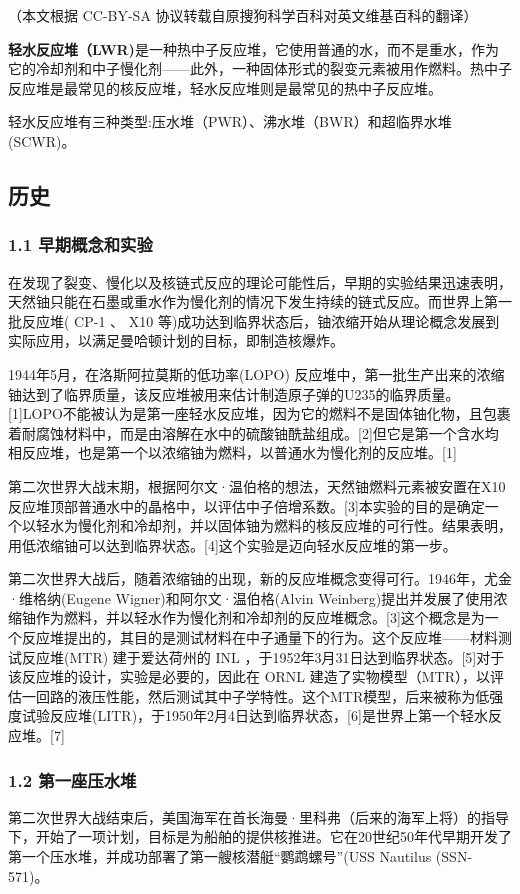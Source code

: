 
（本文根据 CC-BY-SA 协议转载自原搜狗科学百科对英文维基百科的翻译）

\textbf{轻水反应堆（LWR)}是一种热中子反应堆，它使用普通的水，而不是重水，作为它的冷却剂和中子慢化剂——此外，一种固体形式的裂变元素被用作燃料。热中子反应堆是最常见的核反应堆，轻水反应堆则是最常见的热中子反应堆。

轻水反应堆有三种类型:压水堆（PWR）、沸水堆（BWR）和超临界水堆 (SCWR)。

\subsection{历史}
\subsubsection{1.1 早期概念和实验}
在发现了裂变、慢化以及核链式反应的理论可能性后，早期的实验结果迅速表明，天然铀只能在石墨或重水作为慢化剂的情况下发生持续的链式反应。而世界上第一批反应堆( CP-1 、 X10 等)成功达到临界状态后，铀浓缩开始从理论概念发展到实际应用，以满足曼哈顿计划的目标，即制造核爆炸。

1944年5月，在洛斯阿拉莫斯的低功率(LOPO) 反应堆中，第一批生产出来的浓缩铀达到了临界质量，该反应堆被用来估计制造原子弹的U235的临界质量。[1]LOPO不能被认为是第一座轻水反应堆，因为它的燃料不是固体铀化物，且包裹着耐腐蚀材料中，而是由溶解在水中的硫酸铀酰盐组成。[2]但它是第一个含水均相反应堆，也是第一个以浓缩铀为燃料，以普通水为慢化剂的反应堆。[1]

第二次世界大战末期，根据阿尔文·温伯格的想法，天然铀燃料元素被安置在X10反应堆顶部普通水中的晶格中，以评估中子倍增系数。[3]本实验的目的是确定一个以轻水为慢化剂和冷却剂，并以固体铀为燃料的核反应堆的可行性。结果表明，用低浓缩铀可以达到临界状态。[4]这个实验是迈向轻水反应堆的第一步。

第二次世界大战后，随着浓缩铀的出现，新的反应堆概念变得可行。1946年，尤金·维格纳(Eugene Wigner)和阿尔文·温伯格(Alvin Weinberg)提出并发展了使用浓缩铀作为燃料，并以轻水作为慢化剂和冷却剂的反应堆概念。[3]这个概念是为一个反应堆提出的，其目的是测试材料在中子通量下的行为。这个反应堆——材料测试反应堆(MTR) 建于爱达荷州的 INL ，于1952年3月31日达到临界状态。[5]对于该反应堆的设计，实验是必要的，因此在 ORNL 建造了实物模型（MTR），以评估一回路的液压性能，然后测试其中子学特性。这个MTR模型，后来被称为低强度试验反应堆(LITR)，于1950年2月4日达到临界状态，[6]是世界上第一个轻水反应堆。[7]

\subsubsection{1.2 第一座压水堆}
第二次世界大战结束后，美国海军在首长海曼·里科弗（后来的海军上将）的指导下，开始了一项计划，目标是为船舶的提供核推进。它在20世纪50年代早期开发了第一个压水堆，并成功部署了第一艘核潜艇“鹦鹉螺号”(USS Nautilus (SSN-571)。

